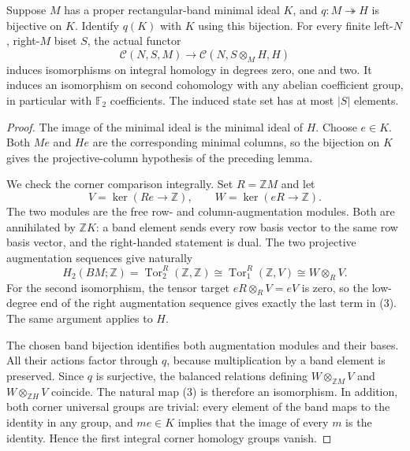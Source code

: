 \begin{theorem}
\label{CP2:A-band-quotient-integral-low-degree}
Suppose $M$ has a proper rectangular-band minimal ideal $K$,
and $q:M\twoheadrightarrow H$ is bijective on $K$.
Identify $q(K)$ with $K$ using this bijection.
For every finite left-$N$, right-$M$ biset $S$, the actual
functor
\[
 \mathcal C(N,S,M)\longrightarrow
 \mathcal C(N,S\otimes_M H,H)
                                                               \tag{2}
\]
induces isomorphisms on integral homology in degrees zero,
one and two.  It induces an isomorphism on second cohomology
with any abelian coefficient group, in particular with
$\mathbb F_2$ coefficients.  The induced state set has at most
$|S|$ elements.
\end{theorem}
\begin{proof}
The image of the minimal ideal is the minimal ideal of $H$.
Choose $e\in K$.  Both $Me$ and $He$ are the corresponding
minimal columns, so the bijection on $K$ gives the
projective-column hypothesis of the preceding lemma.

We check the corner comparison integrally.  Set $R=\mathbb ZM$
and let
\[
 V=\ker(Re\longrightarrow\mathbb Z),\qquad
 W=\ker(eR\longrightarrow\mathbb Z).
\]
The two modules are the free row- and column-augmentation
modules.  Both are annihilated by $\mathbb ZK$:
a band element sends every row basis vector to the same
row basis vector, and the right-handed statement is dual.
The two projective augmentation sequences give naturally
\[
 H_2(BM;\mathbb Z)
   =\operatorname{Tor}^{R}_2(\mathbb Z,\mathbb Z)
   \cong\operatorname{Tor}^{R}_1(\mathbb Z,V)
   \cong W\otimes_R V.                                         \tag{3}
\]
For the second isomorphism, the tensor target
$eR\otimes_R V=eV$ is zero, so the low-degree end of
the right augmentation sequence gives exactly the last term
in (3).  The same argument applies to $H$.

The chosen band bijection identifies both augmentation
modules and their bases.  All their actions factor through
$q$, because multiplication by a band element is preserved.
Since $q$ is surjective, the balanced relations defining
$W\otimes_{\mathbb ZM}V$ and
$W\otimes_{\mathbb ZH}V$ coincide.  The natural map (3)
is therefore an isomorphism.  In addition, both corner
universal groups are trivial: every element of the band
maps to the identity in any group, and $m e\in K$ implies
that the image of every $m$ is the identity.  Hence the
first integral corner homology groups vanish.


\end{proof}
